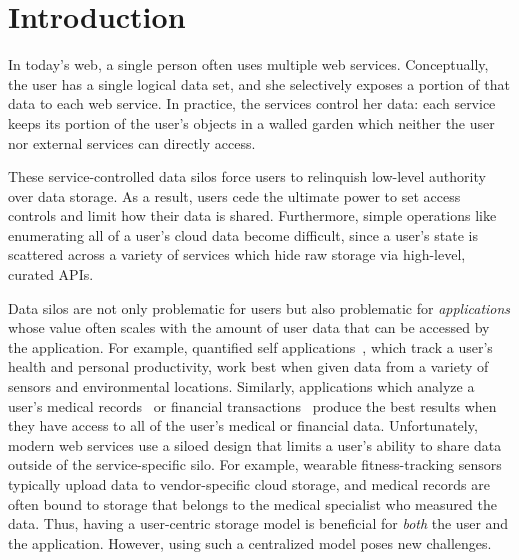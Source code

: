 \chapter{Introduction}

In today's web, a single person often 
uses multiple web services. 
Conceptually, the user has a single
logical data set, and she selectively
exposes a portion of that data to each
web service. In practice, the services
control her data: each service keeps its
portion of the user's objects in a walled
garden which neither the user nor external
services can directly access.

These service-controlled data silos force
users to relinquish low-level authority over
data storage. As a result, users cede the
ultimate power to set access controls and
limit how their data is shared. Furthermore, simple
operations like enumerating all of a user's
cloud data become difficult, since a user's
state is scattered across a variety of services
which hide raw storage via high-level, curated
APIs.

Data silos are not only problematic for
users but also problematic for
\emph{applications} whose value often scales
with the amount of user data that can be
accessed by the application. For example,
quantified self applications~\cite{beam},
which track a user's health and personal
productivity, work best when given data
from a variety of sensors and environmental
locations. Similarly, applications which analyze a
user's medical records~\cite{lark} or financial
transactions~\cite{mint} produce the best
results when they have access to 
all of the user's medical or financial data.
Unfortunately, modern web services use
a siloed design that limits a user's ability to share 
data outside of the service-specific silo. 
For example, wearable
fitness-tracking sensors typically upload data
to vendor-specific cloud storage, and medical
records are often bound to storage that belongs
to the medical specialist who measured the
data. Thus, having a user-centric storage model
is beneficial for \emph{both} the user and the application.
However, using such a centralized model poses new challenges.

